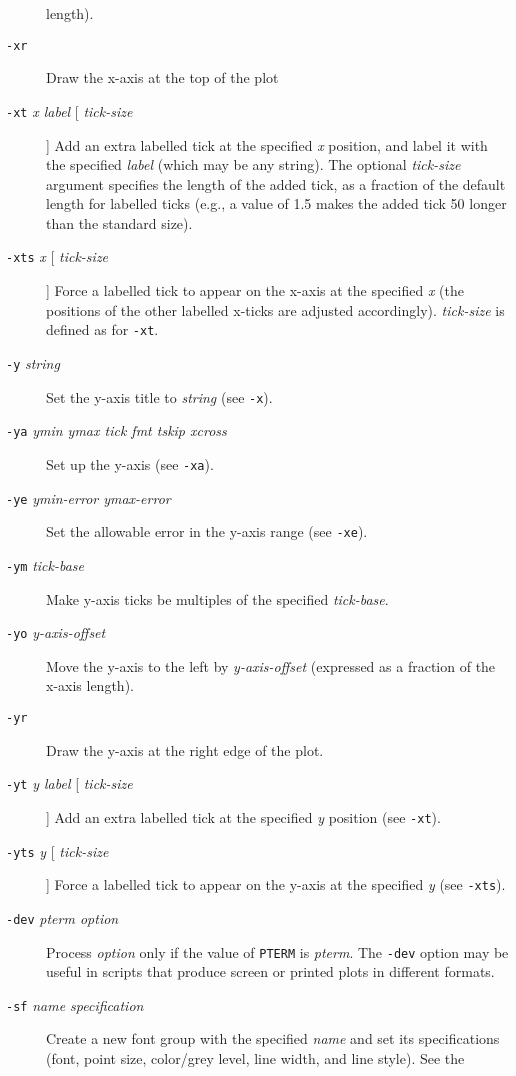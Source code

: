 \begin{description}
length). 
\item [\texttt{-xr} ] Draw the x-axis at the top of the plot 
\item [\texttt{-xt}\textit{ x label} [ \textit{tick-size}
] ] Add an extra labelled tick at the specified \textit{x} position, and label it
with the specified \textit{label} (which may be any string).  The optional \textit{tick-size}
argument specifies the length of the added tick, as a fraction of the default
length for labelled ticks (e.g., a value of 1.5 makes the added tick 50 longer
than the standard size). 
\item [\texttt{-xts}\textit{ x} [ \textit{tick-size} ] ] Force a labelled tick to appear
on the x-axis at the specified \textit{x} (the positions of the other labelled x-ticks
are adjusted accordingly). \textit{tick-size} is defined as for \texttt{-xt}. 
\item [\texttt{-y}\textit{ string} ] Set the
y-axis title to \textit{string} (see \texttt{-x}). 
\item [\texttt{-ya}\textit{ ymin ymax tick fmt tskip xcross} ] Set up
the y-axis (see \texttt{-xa}). 
\item [\texttt{-ye}\textit{ ymin-error ymax-error} ] Set the allowable error in the
y-axis range (see \texttt{-xe}). 
\item [\texttt{-ym}\textit{ tick-base} ] Make y-axis ticks be multiples of the specified
\textit{tick-base}. 
\item [\texttt{-yo}\textit{ y-axis-offset} ] Move the y-axis to the left by \textit{y-axis-offset} (expressed
as a fraction of the x-axis length). 
\item [\texttt{-yr} ] Draw the y-axis at the right edge
of the plot. 
\item [\texttt{-yt}\textit{ y label} [ \textit{tick-size} ] ] Add an extra labelled tick at the specified
\textit{y} position (see \texttt{-xt}). 
\item [\texttt{-yts}\textit{ y} [ \textit{tick-size} ] ] Force a labelled tick to appear
on the y-axis at the specified \textit{y} (see \texttt{-xts}). 
\item [\texttt{-dev}\textit{ pterm option} ] Process \textit{option}
only if the value of \texttt{PTERM} is \textit{pterm}. The \texttt{-dev} option may be useful in scripts
that produce screen or printed plots in different formats. 
\item [\texttt{-sf}\textit{ name specification}
] Create a new font group with the specified \textit{name} and set its specifications
(font, point size, color/grey level, line width, and line style).  See the

\end{description}
